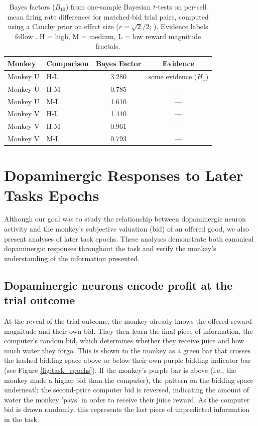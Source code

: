 \begin{table}[h]
\centering
\begin{tabular}{llcc}
\hline
\textbf{Monkey} & \textbf{Comparison} & \textbf{Bayes Factor} & \textbf{Evidence} \\
\hline
Monkey U & H-L & 3.280 & some evidence ($H_1$) \\
Monkey U & H-M & 0.785 & --- \\
Monkey U & M-L & 1.610 & --- \\
\hline
Monkey V & H-L & 1.440 & --- \\
Monkey V & H-M & 0.961 & --- \\
Monkey V & M-L & 0.793 & --- \\
\hline
\end{tabular}
\caption[Bayes factors for matched-bid firing rate comparisons.]{Bayes factors ($B_{10}$) from one-sample Bayesian $t$-tests on per-cell mean firing rate differences for matched-bid trial pairs, computed using a Cauchy prior on effect size ($r = \sqrt{2}/2$; \citealt{rouder2009bayesian}). Evidence labels follow \citet{jeffreys1961theory}. H = high, M = medium, L = low reward magnitude fractals.}
\label{tab:bayes_factor_matched_bids}
\end{table}

\clearpage
\section{Dopaminergic Responses to Later Tasks Epochs}

Although our goal was to study the relationship between dopaminergic neuron activity and the monkey's subjective valuation (bid) of an offered good, we also present analyses of later task epochs. These analyses demonstrate both canonical dopaminergic responses throughout the task and verify the monkey's understanding of the information presented.

\subsection{Dopaminergic neurons encode profit at the trial outcome}

At the reveal of the trial outcome, the monkey already knows the offered reward magnitude and their own bid. They then learn the final piece of information, the computer's random bid, which determines whether they receive juice and how much water they forgo. This is shown to the monkey as a green bar that crosses the hashed bidding space above or below their own purple bidding indicator bar (see Figure \ref{fig:task_epochs}). If the monkey's purple bar is above (i.e., the monkey made a higher bid than the computer), the pattern on the bidding space underneath the second-price computer bid is reversed, indicating the amount of water the monkey 'pays' in order to receive their juice reward. As the computer bid is drawn randomly, this represents the last piece of unpredicted information in the task.

